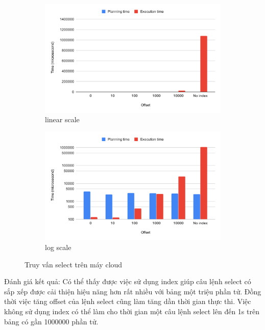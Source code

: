 \begin{figure}[H]
\centering
\begin{subfigure}{0.5\textwidth}
    \centering
    \includegraphics[width=\textwidth]{images/testing/select-cloud.png}
    \caption{linear scale}
\end{subfigure}%
\begin{subfigure}{0.5\textwidth}
    \centering
    \includegraphics[width=\textwidth]{images/testing/select-cloud-log.png}
    \caption{log scale}
\end{subfigure}
\caption{Truy vấn select trên máy cloud}
\end{figure}

Đánh giá kết quả: Có thể thấy được việc sử dụng index giúp câu lệnh
select có sắp xếp được cải thiện hiệu năng hơn rất nhiều với
bảng một triệu phần tử.
Đồng thời việc tăng offset của lệnh select cũng làm tăng dần thời gian
thực thi. Việc không sử dụng index có thể làm cho thời gian một câu lệnh
select lên đến 1s trên bảng có gần 1000000 phần tử.

